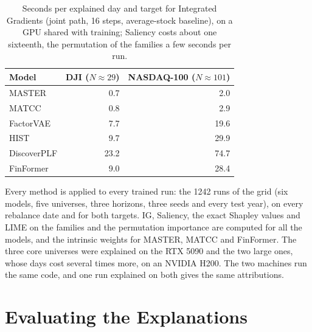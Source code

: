 \begin{table}[htbp]
    \centering
    \small
    \begin{tabular}{@{}lrr@{}}
        \toprule
        \textbf{Model} & \textbf{DJI} ($N \approx 29$) & \textbf{NASDAQ-100} ($N \approx 101$) \\
        \midrule
        MASTER & 0.7 & 2.0 \\
        MATCC & 0.8 & 2.9 \\
        FactorVAE & 7.7 & 19.6 \\
        HIST & 9.7 & 29.9 \\
        DiscoverPLF & 23.2 & 74.7 \\
        FinFormer & 9.0 & 28.4 \\
        \bottomrule
    \end{tabular}
    \caption{Seconds per explained day and target for Integrated Gradients (joint path, 16 steps, average-stock baseline), on a GPU shared with training; Saliency costs about one sixteenth, the permutation of the families a few seconds per run.}
    \label{tab:xm_cost}
\end{table}

Every method is applied to every trained run: the 1242 runs of the grid (six models, five universes, three horizons, three seeds and every test year), on every rebalance date and for both targets. IG, Saliency, the exact Shapley values and LIME on the families and the permutation importance are computed for all the models, and the intrinsic weights for MASTER, MATCC and FinFormer. The three core universes were explained on the RTX 5090 and the two large ones, whose days cost several times more, on an NVIDIA H200. The two machines run the same code, and one run explained on both gives the same attributions. %

\section{Evaluating the Explanations}
\label{sec:xm_evaluation}


